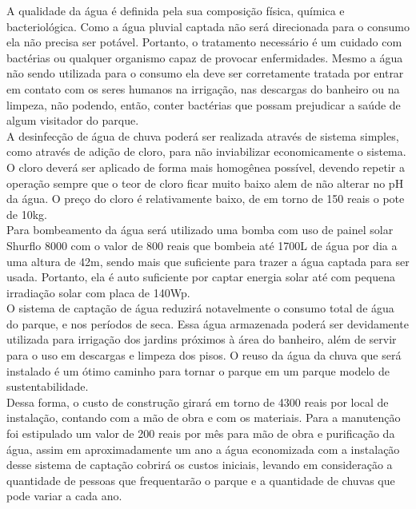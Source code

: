   A qualidade da \'agua \'e definida pela sua composi\c{c}\~ao f\'isica, qu\'imica e bacteriol\'ogica. Como a \'agua pluvial captada n\~ao ser\'a direcionada para o consumo ela n\~ao precisa ser pot\'avel. Portanto, o tratamento necess\'ario \'e um cuidado com bact\'erias ou qualquer organismo capaz de provocar enfermidades. \cite{MINISTERIODASAUDE} Mesmo a \'agua n\~ao sendo utilizada para o consumo ela deve ser corretamente tratada por entrar em contato com os seres humanos na irriga\c{c}\~ao, nas descargas do banheiro ou na limpeza, n\~ao podendo, ent\~ao, conter bact\'erias que possam prejudicar a sa\'ude de algum visitador do parque. \\ A desinfec\c{c}\~ao de \'agua de chuva poder\'a ser realizada atrav\'es de sistema simples, como atrav\'es de adi\c{c}\~ao de cloro, para n\~ao inviabilizar economicamente o sistema. O cloro dever\'a ser aplicado de forma mais homog\^enea poss\'ivel, devendo repetir a opera\c{c}\~ao sempre que o teor de cloro ficar muito baixo alem de n\~ao alterar no pH da \'agua. O pre\c{c}o do cloro \'e relativamente baixo, de em torno de 150 reais o pote de 10kg. \\ Para bombeamento da \'agua ser\'a utilizado uma bomba com uso de painel solar Shurflo 8000 com o valor de 800 reais que bombeia at\'e 1700L de \'agua por dia a uma altura de 42m, sendo mais que suficiente para trazer a \'agua captada para ser usada. Portanto, ela \'e auto suficiente por captar energia solar at\'e com pequena irradia\c{c}\~ao solar com placa de 140Wp. \\ O sistema de capta\c{c}\~ao de \'agua reduzir\'a notavelmente o consumo total de \'agua do parque, e nos per\'iodos de seca. Essa \'agua armazenada poder\'a ser devidamente utilizada para irriga\c{c}\~ao dos jardins pr\'oximos \`a \'area do banheiro, al\'em de servir para o uso em descargas e limpeza dos pisos. O reuso da \'agua da chuva que ser\'a instalado \'e um \'otimo caminho para tornar o parque em um parque modelo de sustentabilidade. \\  Dessa forma, o custo de constru\c{c}\~ao girar\'a em torno de 4300 reais por local de instala\c{c}\~ao, contando com a m\~ao de obra e com os materiais. Para a manuten\c{c}\~ao foi estipulado um valor de 200 reais por m\^es para m\~ao de obra e purifica\c{c}\~ao da \'agua, assim em aproximadamente um ano a \'agua economizada com a instala\c{c}\~ao desse sistema de capta\c{c}\~ao cobrir\'a os custos iniciais, levando em considera\c{c}\~ao a quantidade de pessoas que frequentar\~ao o parque e a quantidade de chuvas que pode variar a cada ano.
  
